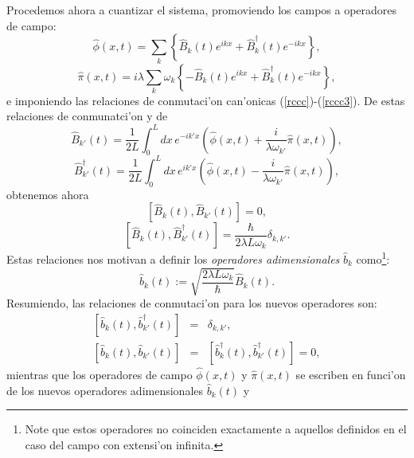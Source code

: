 Procedemos ahora a cuantizar el sistema, promoviendo los campos a operadores de
campo:
\begin{equation}
\hat{\phi}(x,t) =\sum_k\left\{ \hat{B}_k(t)
e^{ikx}+\hat{B}_k^\dagger (t) e^{-ikx}\right\},
\label{qOperador12}
\end{equation}
\begin{equation}
\hat{\pi}(x,t) =i\lambda\sum_k\omega_k\left\{ -\hat{B}_k(t)
e^{ikx}+\hat{B}_k^\dagger (t)
e^{-ikx}\right\},\label{piOperador12}
\end{equation}
e  imponiendo las relaciones de conmutaci'on can'onicas
(\ref{rccc})-(\ref{rccc3}). De estas relaciones de conmunatci'on y de
\begin{equation}
\hat{B}_{k'}(t)  = \frac{1}{2L}\int_0^L dx\, e^{-ik'x}\left( \hat{\phi}(x,t)
+\frac{i}{\lambda\omega_{k'}}\hat{\pi}(x,t) \right) ,\label{BOperador2}
\end{equation}
\begin{equation}
\hat{B}_{k'}^\dagger (t) =\frac{1}{2 L}\int_0^L dx\, e^{ik'x}\left(
\hat{\phi}(x,t) -\frac{i}{\lambda\omega_{k'}}\hat{\pi}(x,t) \right)
,\label{BdagOperador2}
\end{equation}
obtenemos ahora
\begin{equation}
\left[ \hat{B}_k(t) ,\hat{B}_{k'}(t) \right]=0,
\end{equation}
\begin{equation}
\left[ \hat{B}_k(t) ,\hat{B}^\dagger _{k'}(t) \right]=\frac{\hbar}{2\lambda
L\omega_k} \delta_{k,k'}.
\end{equation}
Estas relaciones nos motivan a definir los \textit{operadores adimensionales}
$\hat{b}_k$ como\footnote{Note que estos operadores no coinciden exactamente a
aquellos definidos en el caso del campo con extensi'on infinita.}:
\begin{equation}
\hat{b}_k(t):=\sqrt{\frac{2\lambda L\omega_k}{\hbar}}\hat{B}_k(t).
\end{equation}
Resumiendo, las relaciones de conmutaci'on para los nuevos operadores son:
\begin{eqnarray}
\left[ \hat{b}_k(t) ,\hat{b}_{k'}^\dagger (t) \right] & = & \delta_{k,k'},
\label{rcbbd}\\
\left[ \hat{b}_k(t) ,\hat{b}_{k'}(t) \right] & = &\left[
\hat{b}_k^\dagger (t) ,\hat{b}_{k'}^\dagger (t) \right] =0
,\label{ConmutadoresDebk2}
\end{eqnarray}
mientras que los operadores de campo $\hat{\phi}(x,t) $ y $\hat{\pi}(x,t) $ se
escriben en funci'on de los nuevos operadores adimensionales $\hat{b}_k(t) $ y
